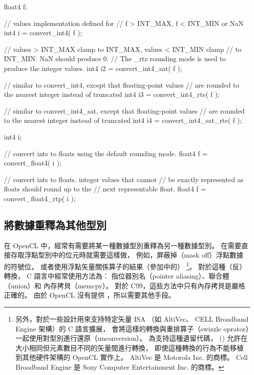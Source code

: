 \startexample
\startclc
float4 f;

// values implementation defined for
// f > INT_MAX, f < INT_MIN or NaN
int4	i = convert_int4( f );

// values > INT_MAX clamp to INT_MAX, values < INT_MIN clamp
// to INT_MIN. NaN should produce 0.
// The _rtz rounding mode is used to produce the integer values.
int4	i2 = convert_int4_sat( f );

// similar to convert_int4, except that floating-point values
// are rounded to the nearest integer instead of truncated
int4	i3 = convert_int4_rte( f );

// similar to convert_int4_sat, except that floating-point values
// are rounded to the nearest integer instead of truncated
int4	i4 = convert_int4_sat_rte( f );
\stopclc
\stopexample

\startexample
\startclc
int4	i;

// convert ints to floats using the default rounding mode.
float4 f = convert_float4( i );

// convert ints to floats. integer values that cannot
// be exactly represented as floats should round up to the
// next representable float.
float4 f = convert_float4_rtp( i );
\stopclc
\stopexample

\subsection[sec:reinterpret]{將數據重釋為其他型別}

在 OpenCL 中，經常有需要將某一種數據型別重釋為另一種數據型別。
在需要直接存取浮點型別中的位元時就需要這樣做，
例如，屏蔽掉（mask off）浮點數據的符號位，
或者使用浮點矢量關係算子的結果（參加中的）
\footnote{另外，對於一些設計用來支持特定矢量 ISA
（如 AltiVec、 CELL Broadband Engine 架構）的 C 語言擴展，
會將這樣的轉換與重排算子（swizzle oprator）一起使用對型別進行還原（unconversion）。
為支持這種遺留代碼， () 允許在大小相同但元素數目不同的矢量間進行轉換，
即使這種轉換的行為不能移植到其他硬件架構的 OpenCL 實作上。
 AltiVec 是 Motorola Inc. 的商標。
 Cell Broadband Engine 是 Sony Computer Entertainment Inc. 的商標。}。
對於這種（反）轉換， C 語言中經常使用方法為：
指位器別名（pointer aliasing）、聯合體（union）和 內存拷貝（memcpy）。
對於 C99，這些方法中只有內存拷貝是嚴格正確的。
由於 OpenCL 沒有提供 ，所以需要其他手段。

